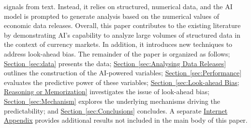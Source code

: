 \documentclass[12pt,oneside,letter]{article}
\newcommand*{\mysec}[1]{\hyperref[{#1}]{Section~\ref*{#1}}}
\newcommand{\mysecIAheader}[1]{\hyperref[{#1}]{Internet Appendix}}
\begin{document}
signals from text. Instead, it relies on structured, numerical data, and the AI model is prompted to generate analysis based on the numerical values of economic data releases. Overall, this paper contributes to the existing literature by demonstrating AI's capability to analyze large volumes of structured data in the context of currency markets. In addition, it introduces new techniques to address look-ahead bias.\newline
	The remainder of the paper is organized as follows; \mysec{sec:data} presents the data; \mysec{sec:Analysing Data Releases} outlines the construction of the AI-powered variables; \mysec{sec:Performance} evaluates the predictive power of these variables; \mysec{sec:Look-ahead Bias; Reasoning or Memorization} investigates the issue of look-ahead bias; \mysec{sec:Mechanism} explores the underlying mechanisms driving the predictability; and \mysec{sec:Conclusions} concludes. A separate \mysecIAheader{appendix} provides additional results not included in the main body of this paper.
\end{document}
